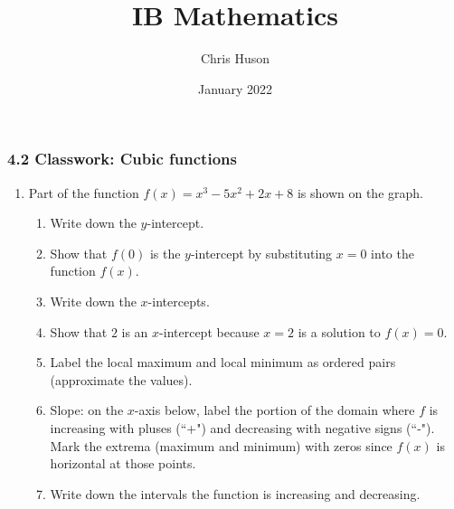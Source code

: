 \documentclass[12pt, twoside]{article}
\title{IB Mathematics}
\author{Chris Huson}
\date{January 2022}
\begin{document}
\subsubsection*{4.2 Classwork: Cubic functions}
\begin{enumerate}
\item Part of the function $f(x)=x^3-5x^2+2x+8$ is shown on the graph.\\

    \begin{enumerate}
    \item Write down the $y$-intercept.
    \item Show that $f(0)$ is the $y$-intercept by substituting $x=0$ into the function $f(x)$.\vspace{1cm}
    \item Write down the $x$-intercepts.
    \item Show that $2$ is an $x$-intercept because $x=2$ is a solution to $f(x)=0$.\vspace{1cm}
    \item Label the local maximum and local minimum as ordered pairs (approximate the values).
    \item Slope: on the $x$-axis below, label the portion of the domain where $f$ is increasing with pluses (``+") and decreasing with negative signs (``-"). Mark the extrema (maximum and minimum) with zeros since $f(x)$ is horizontal at those points.
    \item Write down the intervals the function is increasing and decreasing.
    \end{enumerate}\vspace{1cm}


\end{enumerate}
\end{document}
